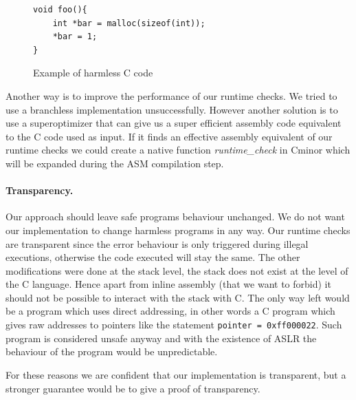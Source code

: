\documentclass[11pt]{sdm}
\begin{document}
\begin{figure}[!ht]
\begin{lstlisting}
void foo(){
	int *bar = malloc(sizeof(int));
	*bar = 1;
}
\end{lstlisting}
\centering
\caption{Example of harmless C code }
\label{harmless}
\end{figure}

\hfill \break
Another way is to improve the performance of our runtime checks. We tried to use a branchless implementation unsuccessfully. However another solution is to use a superoptimizer that can give us a super efficient assembly code equivalent to the C code used as input. If it finds an effective assembly equivalent of our runtime checks we could create a native function \textit{runtime\_check} in Cminor which will be expanded during the ASM compilation step.

\paragraph{Transparency.}
\label{par:Transparency}
Our approach should leave safe programs behaviour unchanged. We do not want our implementation to change harmless programs in any way. Our runtime checks are transparent since the error behaviour is only triggered during illegal executions, otherwise the code executed will stay the same. The other modifications were done at the stack level, the stack does not exist at the level of the C language.
Hence apart from inline assembly (that we want to forbid) it should not be possible to interact with the stack with C. The only way left would be a program which uses direct addressing, in other words a C program which gives raw addresses to pointers like the statement \texttt{pointer = 0xff000022}.
Such program is considered unsafe anyway and with the existence of ASLR the behaviour of the program would be unpredictable.

For these reasons we are confident that our implementation is transparent, but a stronger guarantee would be to give a proof of transparency.

\newpage
\end{document}
